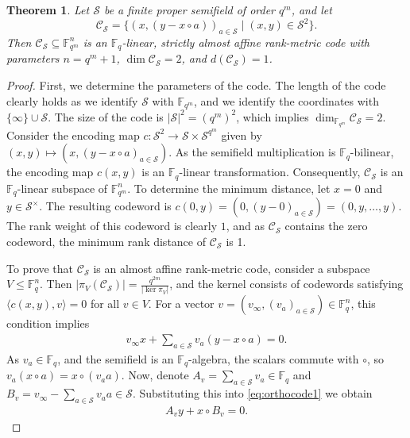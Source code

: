 \documentclass[a4paper,11pt,reqno]{article}
\newcommand{\F}{\mathbb{F}}
\newcommand{\C}{\mathcal{C}}
\renewcommand{\S}{\mathcal{S}}
\theoremstyle{plain} \numberwithin{equation}{section}
\newtheorem{theorem}{Theorem}[section]
\theoremstyle{definition}
\begin{document}
\begin{theorem}
Let $\S$ be a finite proper semifield of order $q^m$, and let $$\C_\S = \{ (x,(y-x\circ a))_{a\in \S}\mid (x,y)\in \S^2\}.$$ Then $\C_\S \subseteq \F_{q^m}^n$ is an $\F_q$-linear, strictly almost affine rank-metric code with parameters $n=q^m+1$, $\dim \C_\S = 2$, and $d(\C_\S)=1$. \label{thm:construction2dim}
\end{theorem}
\begin{proof}
First, we determine the parameters of the code. The length of the code clearly holds as we identify $\mathcal{S}$ with $\mathbb{F}_{q^m}$, and we identify the coordinates with $\{\infty\} \cup \mathcal{S}$. The size of the code is $|\mathcal{S}|^2 = (q^m)^2$, which implies $\dim_{\mathbb{F}_{q^m}} \mathcal{C}_{\mathcal{S}} = 2$. Consider the encoding map $c\colon \mathcal{S}^2 \rightarrow \mathcal{S}\times \mathcal{S}^{q^m}$ given by $(x,y)\mapsto (x,(y-x\circ a)_{a\in \mathcal{S}})$. As the semifield multiplication is $\mathbb{F}_q$-bilinear, the encoding map $c(x,y)$ is an $\mathbb{F}_q$-linear transformation. Consequently, $\mathcal{C}_{\mathcal{S}}$ is an $\mathbb{F}_q$-linear subspace of $\mathbb{F}_{q^m}^n$. To determine the minimum distance, let $x=0$ and $y\in \mathcal{S}^\times$. The resulting codeword is $c(0,y) = (0,(y-0)_{a\in \mathcal{S}})=(0,y,\ldots,y)$. The rank weight of this codeword is clearly $1$, and as $\mathcal{C}_{\mathcal{S}}$ contains the zero codeword, the minimum rank distance of $\mathcal{C}_{\mathcal{S}}$ is 1.

To prove that $\mathcal{C}_{\mathcal{S}}$ is an almost affine rank-metric code, consider a subspace $V\leq \mathbb{F}_q^n$. Then $|\pi_V(\mathcal{C}_{\mathcal{S}})|= \frac{q^{2m}}{|\ker \pi_V|}$, and the kernel consists of codewords satisfying $\langle c(x,y),v\rangle =0$ for all $v\in V$. For a vector $v=(v_{\infty},(v_a)_{a\in \mathcal{S}}) \in \mathbb{F}_q^n$, this condition implies
\begin{align}
    v_\infty x + \sum_{a\in \mathcal{S}} v_a(y-x\circ a) =0. \label{eq:orthocode1}
\end{align}
As $v_a\in \mathbb{F}_q$, and the semifield is an $\mathbb{F}_q$-algebra, the scalars commute with $\circ$, so $v_a(x\circ a ) = x\circ (v_a a)$. Now, denote $A_v = \sum_{a\in \mathcal{S}} v_a \in \mathbb{F}_q$ and $B_v = v_\infty - \sum_{a\in \mathcal{S}} v_a a \in \mathcal{S}$. Substituting this into \eqref{eq:orthocode1} we obtain
\begin{align}
    A_v y + x\circ B_v = 0. \label{eq:orthocode2}
\end{align}


\end{proof}
\end{document}

